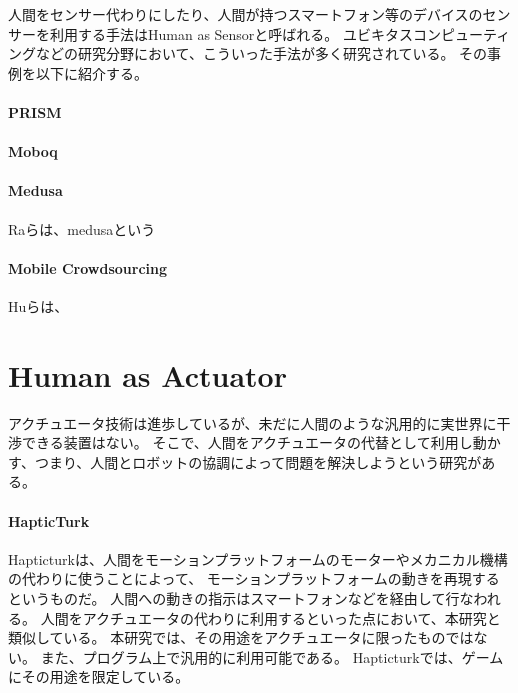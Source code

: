 人間をセンサー代わりにしたり、人間が持つスマートフォン等のデバイスのセンサーを利用する手法はHuman
as Sensorと呼ばれる。
ユビキタスコンピューティングなどの研究分野において、こういった手法が多く研究されている。
その事例を以下に紹介する。

\paragraph{PRISM}\label{prism}

\mbox{}

\cite{prism}

\paragraph{Moboq}\label{moboq}

\mbox{}

\cite{moboq}

\paragraph{Medusa}\label{medusa}

\mbox{}

Raらは、medusa\cite{Ra-medusa}という

\paragraph{Mobile Crowdsourcing}\label{mobile-crowdsourcing}

\mbox{}

Huらは、\cite{Hu:mobilecrowdsensing}

\section{Human as Actuator}\label{human-as-actuator}

アクチュエータ技術は進歩しているが、未だに人間のような汎用的に実世界に干渉できる装置はない。
そこで、人間をアクチュエータの代替として利用し動かす、つまり、人間とロボットの協調によって問題を解決しようという研究がある。

\paragraph{HapticTurk}\label{hapticturk}

\mbox{}

Hapticturk\cite{hapticturk}は、人間をモーションプラットフォームのモーターやメカニカル機構の代わりに使うことによって、
モーションプラットフォームの動きを再現するというものだ。
人間への動きの指示はスマートフォンなどを経由して行なわれる。
人間をアクチュエータの代わりに利用するといった点において、本研究と類似している。
本研究では、その用途をアクチュエータに限ったものではない。
また、プログラム上で汎用的に利用可能である。
Hapticturkでは、ゲームにその用途を限定している。

